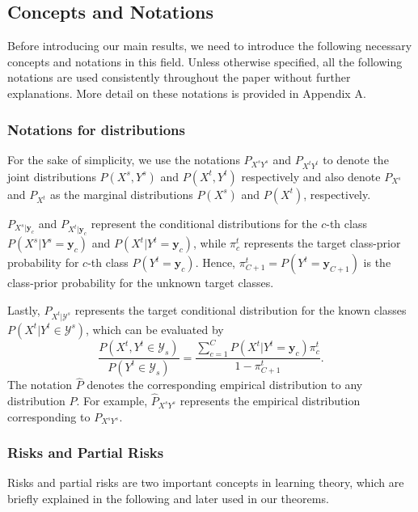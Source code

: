 \documentclass[journal]{IEEEtran}
\begin{document}
  




\subsection{{Concepts and Notations}}
\vspace{-0.1cm}
Before introducing our main results, we need to introduce the following necessary concepts and notations in this field. 
Unless otherwise specified, all the following notations are used consistently throughout the paper without further explanations. More detail on these notations is provided in Appendix A.


\subsubsection{{Notations for distributions}} For the
sake of simplicity, we use the notations $P_{X^sY^s}$ and $P_{X^tY^t}$ to denote the joint distributions $P(X^s,Y^s)$ and $P(X^t,Y^t)$ respectively and also denote $P_{X^s}$ and $P_{X^t}$ as the marginal distributions $P(X^s)$ and $P(X^t)$, respectively. 

$P_{X^s|{\mathbf{y}}_c}$ and $P_{X^t|{\mathbf{y}}_c}$ represent the conditional distributions for the $c$-th class $P(X^s|Y^s={\mathbf{y}}_{c})$ and $P(X^t|Y^t={\mathbf{y}}_{c})$, while $\pi^t_c$ represents the {target class-prior probability} for $c$-th class $P(Y^t=\mathbf{y}_{c})$. Hence, $\pi^t_{C+1}=P(Y^t={\mathbf{y}}_{C+1})$ is the {class-prior probability for the unknown target classes}. 


Lastly, $P_{X^t|\mathcal{Y}^s}$ represents the target conditional distribution for the known classes $P({X^t|Y^t\in \mathcal{Y}^s})$, which can be evaluated by
\begin{equation*}
\frac{ P(X^t,Y^t \in \mathcal{Y}_s)}{P(Y^t \in \mathcal{Y}_s)}=\frac{\sum_{c=1}^C P(X^t|Y^t = \mathbf{y}_c)\pi^t_{c}}{1-\pi^t_{C+1}}.
\end{equation*}
The notation $\widehat{P}$ denotes the corresponding empirical distribution to any distribution $P$. For example, $\widehat{{P}}_{X^sY^s}$ represents the empirical distribution corresponding to ${{P}}_{X^sY^s}$.

\subsubsection{{Risks and Partial Risks}} Risks and partial risks are two important concepts in learning theory, which are briefly explained in the following and later used in our theorems. 
\end{document}
